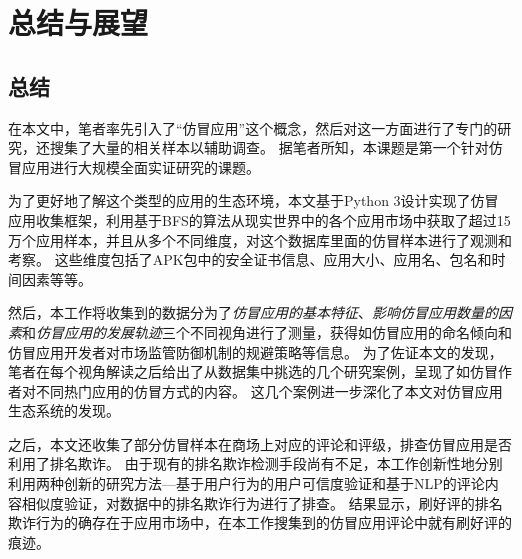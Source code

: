 \chapter{总结与展望}
\label{chp:future}

\section{总结}
在本文中，笔者率先引入了``仿冒应用''这个概念，然后对这一方面进行了专门的研究，还搜集了大量的相关样本以辅助调查。
据笔者所知，本课题是第一个针对仿冒应用进行大规模全面实证研究的课题。

为了更好地了解这个类型的应用的生态环境，本文基于Python 3设计实现了仿冒应用收集框架\mytool，利用基于BFS的算法从现实世界中的各个应用市场中获取了超过15万个应用样本，并且从多个不同维度，对这个数据库里面的仿冒样本进行了观测和考察。
这些维度包括了APK包中的安全证书信息、应用大小、应用名、包名和时间因素等等。

然后，本工作将收集到的数据分为了\emph{仿冒应用的基本特征}、\emph{影响仿冒应用数量的因素}和\emph{仿冒应用的发展轨迹}三个不同视角进行了测量，获得如仿冒应用的命名倾向和仿冒应用开发者对市场监管防御机制的规避策略等信息。
为了佐证本文的发现，笔者在每个视角解读之后给出了从数据集中挑选的几个研究案例，呈现了如仿冒作者对不同热门应用的仿冒方式的内容。
这几个案例进一步深化了本文对仿冒应用生态系统的发现。

之后，本文还收集了部分仿冒样本在商场上对应的评论和评级，排查仿冒应用是否利用了排名欺诈。
由于现有的排名欺诈检测手段尚有不足，本工作创新性地分别利用两种创新的研究方法---基于用户行为的用户可信度验证和基于NLP的评论内容相似度验证，对数据中的排名欺诈行为进行了排查。
结果显示，刷好评的排名欺诈行为的确存在于应用市场中，在本工作搜集到的仿冒应用评论中就有刷好评的痕迹。

